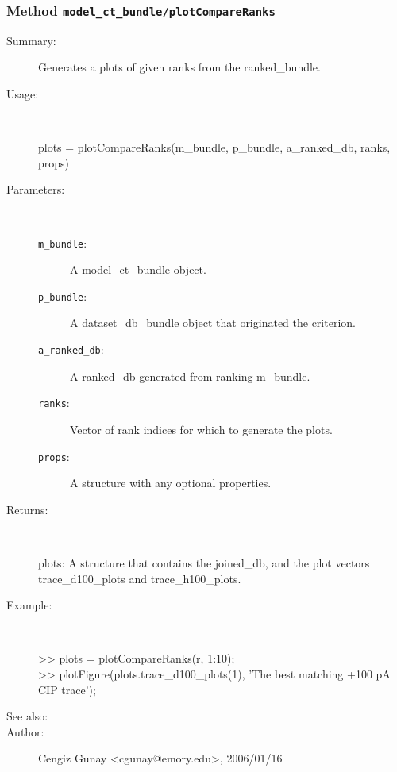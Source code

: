 \subsubsection[Method \texttt{plotCompareRanks}]{Method \texttt{model\_ct\_bundle/plotCompareRanks}}%
%
\label{ref_model_ct_bundle__plotCompareRanks}%
\hypertarget{ref_model_ct_bundle__plotCompareRanks}{}%
\begin{description}
\item[Summary:]Generates a plots of given ranks from the ranked\_bundle.
%
\item[Usage:]~%
\begin{lyxcode}%
plots = plotCompareRanks(m\_bundle, p\_bundle, a\_ranked\_db, ranks, props)
%
\end{lyxcode}%
%
%
\item[Parameters:]~
\begin{description}%
\item[\texttt{m\_bundle}:]
 A model\_ct\_bundle object.
\item[\texttt{p\_bundle}:]
 A dataset\_db\_bundle object that originated the criterion.
\item[\texttt{a\_ranked\_db}:]
 A ranked\_db generated from ranking m\_bundle.
\item[\texttt{ranks}:]
 Vector of rank indices for which to generate the plots.
\item[\texttt{props}:]
 A structure with any optional properties.
\end{description}%
%
\item[Returns:
]~

	plots: A structure that contains the joined\_db, and the plot vectors 
	  trace\_d100\_plots and trace\_h100\_plots.
%
\item[Example:]~
\begin{lyxcode} >> plots = plotCompareRanks(r, 1:10);
\\%
 >> plotFigure(plots.trace\_d100\_plots(1), 'The best matching +100 pA CIP trace');
\\%
\end{lyxcode}
%
\item[See also:]%
%
\item[Author:]%
Cengiz Gunay <cgunay@emory.edu>, 2006/01/16
%
\end{description}
\methodline%
